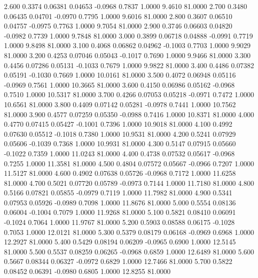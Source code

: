    2.600   0.3374   0.06381   0.04653  -0.0968   0.7837   1.0000   9.4610  81.0000
   2.700   0.3480   0.06435   0.04701  -0.0970   0.7795   1.0000   9.6016  81.0000
   2.800   0.3607   0.06510   0.04757  -0.0975   0.7763   1.0000   9.7054  81.0000
   2.900   0.3746   0.06603   0.04820  -0.0982   0.7739   1.0000   9.7848  81.0000
   3.000   0.3899   0.06718   0.04888  -0.0991   0.7719   1.0000   9.8498  81.0000
   3.100   0.4068   0.06862   0.04962  -0.1003   0.7703   1.0000   9.9029  81.0000
   3.200   0.4253   0.07046   0.05043  -0.1017   0.7690   1.0000   9.9466  81.0000
   3.300   0.4456   0.07286   0.05131  -0.1033   0.7679   1.0000   9.9822  81.0000
   3.400   0.4486   0.07382   0.05191  -0.1030   0.7669   1.0000  10.0161  81.0000
   3.500   0.4072   0.06948   0.05116  -0.0969   0.7561   1.0000  10.3665  81.0000
   3.600   0.4150   0.06986   0.05162  -0.0968   0.7510   1.0000  10.5317  81.0000
   3.700   0.4266   0.07053   0.05218  -0.0971   0.7472   1.0000  10.6561  81.0000
   3.800   0.4409   0.07142   0.05281  -0.0978   0.7441   1.0000  10.7562  81.0000
   3.900   0.4577   0.07259   0.05350  -0.0988   0.7416   1.0000  10.8371  81.0000
   4.000   0.4770   0.07415   0.05427  -0.1001   0.7396   1.0000  10.9018  81.0000
   4.100   0.4992   0.07630   0.05512  -0.1018   0.7380   1.0000  10.9531  81.0000
   4.200   0.5241   0.07929   0.05606  -0.1039   0.7368   1.0000  10.9931  81.0000
   4.300   0.5147   0.07915   0.05660  -0.1022   0.7359   1.0000  11.0243  81.0000
   4.400   0.4738   0.07532   0.05617  -0.0968   0.7255   1.0000  11.3581  81.0000
   4.500   0.4804   0.07572   0.05667  -0.0966   0.7207   1.0000  11.5127  81.0000
   4.600   0.4902   0.07638   0.05726  -0.0968   0.7172   1.0000  11.6258  81.0000
   4.700   0.5021   0.07720   0.05789  -0.0973   0.7144   1.0000  11.7180  81.0000
   4.800   0.5166   0.07821   0.05855  -0.0979   0.7119   1.0000  11.7982  81.0000
   4.900   0.5341   0.07953   0.05926  -0.0989   0.7098   1.0000  11.8676  81.0000
   5.000   0.5554   0.08136   0.06004  -0.1004   0.7079   1.0000  11.9268  81.0000
   5.100   0.5821   0.08410   0.06091  -0.1024   0.7064   1.0000  11.9767  81.0000
   5.200   0.5903   0.08588   0.06175  -0.1028   0.7053   1.0000  12.0121  81.0000
   5.300   0.5379   0.08179   0.06168  -0.0969   0.6968   1.0000  12.2927  81.0000
   5.400   0.5429   0.08194   0.06209  -0.0965   0.6900   1.0000  12.5145  81.0000
   5.500   0.5537   0.08259   0.06265  -0.0968   0.6859   1.0000  12.6489  81.0000
   5.600   0.5667   0.08344   0.06327  -0.0972   0.6829   1.0000  12.7466  81.0000
   5.700   0.5822   0.08452   0.06391  -0.0980   0.6805   1.0000  12.8255  81.0000
